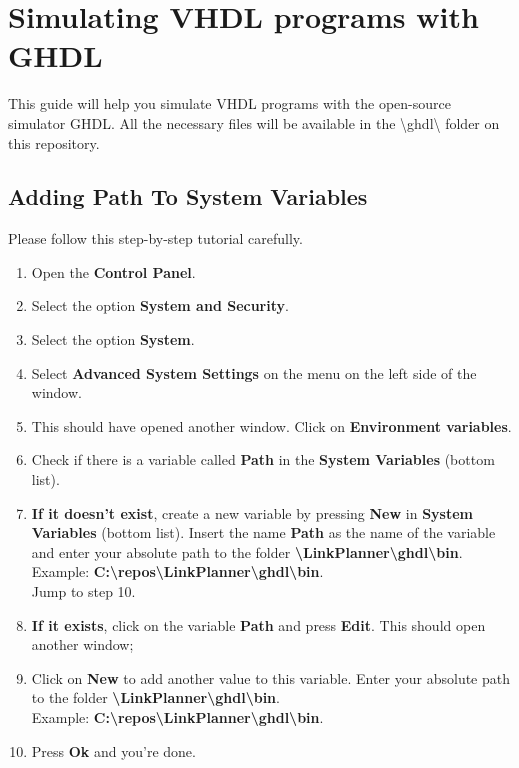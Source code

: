 \chapter{Simulating VHDL programs with GHDL}

This guide will help you simulate VHDL programs with the open-source simulator GHDL.
All the necessary files will be available in the \textbackslash{}ghdl\textbackslash{} folder on this repository.

\section{Adding Path To System Variables}
Please follow this step-by-step tutorial carefully.
  \begin{enumerate}
    \item Open the \textbf{Control Panel}.
    \item Select the option \textbf{System and Security}.
    \item Select the option \textbf{System}.
    \item Select \textbf{Advanced System Settings} on the menu on the left side of the window.
    \item This should have opened another window. Click on \textbf{Environment variables}.
    \item Check if there is a variable called \textbf{Path} in the \textbf{System Variables} (bottom list).
    \item \textbf{If it doesn't exist}, create a new variable by pressing \textbf{New} in \textbf{System Variables} (bottom list). Insert the name \textbf{Path} as the name of the variable and enter your absolute path to the folder \textbf{\textbackslash{}LinkPlanner\textbackslash{}ghdl\textbackslash{}bin}.\\ Example:
        \textbf{C:\textbackslash{}repos\textbackslash{}LinkPlanner\textbackslash{}ghdl\textbackslash{}bin}.\\
          Jump to step 10.
    \item \textbf{If it exists}, click on the variable \textbf{Path} and press \textbf{Edit}. This should open another window;
    \item Click on \textbf{New} to add another value to this variable. Enter your absolute path to the folder \textbf{\textbackslash{}LinkPlanner\textbackslash{}ghdl\textbackslash{}bin}.\\ Example:
        \textbf{C:\textbackslash{}repos\textbackslash{}LinkPlanner\textbackslash{}ghdl\textbackslash{}bin}.\\
    \item Press \textbf{Ok} and you're done.
  \end{enumerate}
\pagebreak
